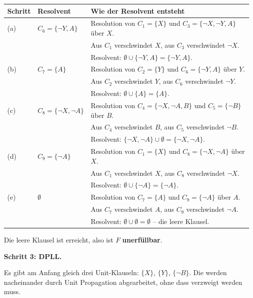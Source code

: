 \documentclass[a4paper,12pt]{article}
\begin{document}
\begin{center}
\small
\renewcommand{\arraystretch}{1.3}
\begin{tabular}{p{}p{}p{}}
\toprule
Schritt & Resolvent & Wie der Resolvent entsteht \\
\midrule
(a)
& $C_6 = \{\neg Y, A\}$
& Resolution von $C_1 = \{X\}$ und $C_3 = \{\neg X, \neg Y, A\}$ \"uber $X$.\\
&& Aus $C_1$ verschwindet $X$, aus $C_3$ verschwindet $\neg X$.\\
&& Resolvent: $\emptyset \cup \{\neg Y, A\} = \{\neg Y, A\}$. \\
\midrule
(b)
& $C_7 = \{A\}$
& Resolution von $C_2 = \{Y\}$ und $C_6 = \{\neg Y, A\}$ \"uber $Y$.\\
&& Aus $C_2$ verschwindet $Y$, aus $C_6$ verschwindet $\neg Y$.\\
&& Resolvent: $\emptyset \cup \{A\} = \{A\}$. \\
\midrule
(c)
& $C_8 = \{\neg X, \neg A\}$
& Resolution von $C_4 = \{\neg X, \neg A, B\}$ und $C_5 = \{\neg B\}$ \"uber $B$.\\
&& Aus $C_4$ verschwindet $B$, aus $C_5$ verschwindet $\neg B$.\\
&& Resolvent: $\{\neg X, \neg A\} \cup \emptyset = \{\neg X, \neg A\}$. \\
\midrule
(d)
& $C_9 = \{\neg A\}$
& Resolution von $C_1 = \{X\}$ und $C_8 = \{\neg X, \neg A\}$ \"uber $X$.\\
&& Aus $C_1$ verschwindet $X$, aus $C_8$ verschwindet $\neg X$.\\
&& Resolvent: $\emptyset \cup \{\neg A\} = \{\neg A\}$. \\
\midrule
(e)
& $\emptyset$
& Resolution von $C_7 = \{A\}$ und $C_9 = \{\neg A\}$ \"uber $A$.\\
&& Aus $C_7$ verschwindet $A$, aus $C_9$ verschwindet $\neg A$.\\
&& Resolvent: $\emptyset \cup \emptyset = \emptyset$ -- die leere Klausel.\\
\bottomrule
\end{tabular}
\end{center}

Die leere Klausel ist erreicht, also ist $F$ \textbf{unerf\"ullbar}.

\bigskip
\textbf{Schritt 3: DPLL.}

Es gibt am Anfang gleich drei Unit-Klauseln: $\{X\}$, $\{Y\}$, $\{\neg B\}$.
Die werden nacheinander durch Unit Propagation abgearbeitet, ohne dass
verzweigt werden muss.
\end{document}
